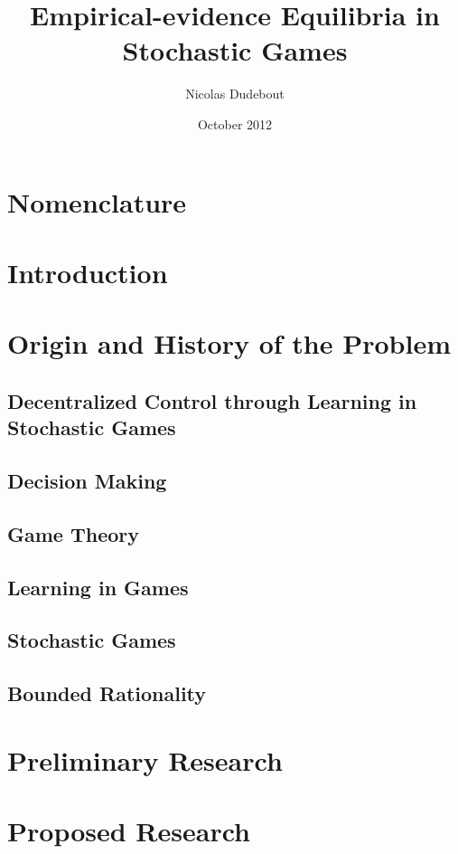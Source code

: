 \documentclass[12pt,toc=bib,twoside,paper=letter,pagesize]{scrbook}
\title{Empirical-evidence Equilibria in Stochastic Games}
\author{Nicolas Dudebout}
\date{October 2012}
\theoremstyle{ddbsans}
\begin{document}
\frontmatter
\maketitle
\tableofcontents
\chapter*{Nomenclature}



\mainmatter
\chapter{Introduction}


\chapter{Origin and History of the Problem}
\label{sec:origin_and_history_of_the_problem}
\section{Decentralized Control through Learning in Stochastic Games}

\section{Decision Making}

\section{Game Theory}

\section{Learning in Games}

\section{Stochastic Games}

\section{Bounded Rationality}


\chapter{Preliminary Research}


\chapter{Proposed Research}



\backmatter


\end{document}
